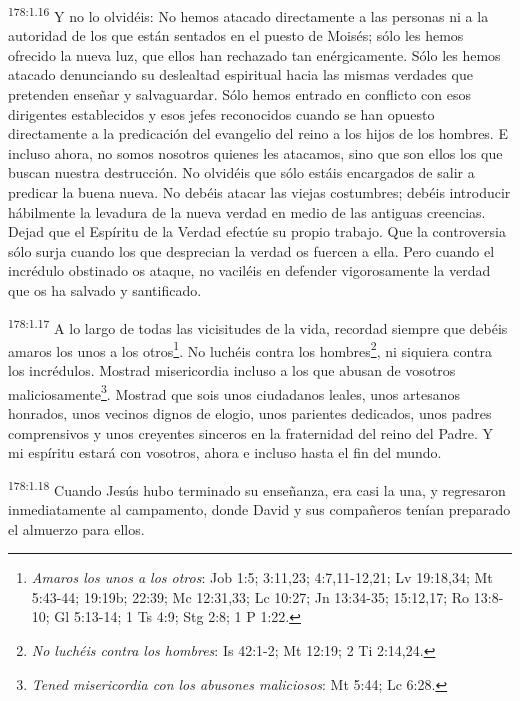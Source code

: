 \par
\textsuperscript{178:1.16} Y no lo olvidéis: No hemos atacado directamente a las personas ni a la autoridad de los que están sentados en el puesto de Moisés; sólo les hemos ofrecido la nueva luz, que ellos han rechazado tan enérgicamente. Sólo les hemos atacado denunciando su deslealtad espiritual hacia las mismas verdades que pretenden enseñar y salvaguardar. Sólo hemos entrado en conflicto con esos dirigentes establecidos y esos jefes reconocidos cuando se han opuesto directamente a la predicación del evangelio del reino a los hijos de los hombres. E incluso ahora, no somos nosotros quienes les atacamos, sino que son ellos los que buscan nuestra destrucción. No olvidéis que sólo estáis encargados de salir a predicar la buena nueva. No debéis atacar las viejas costumbres; debéis introducir hábilmente la levadura de la nueva verdad en medio de las antiguas creencias. Dejad que el Espíritu de la Verdad efectúe su propio trabajo. Que la controversia sólo surja cuando los que desprecian la verdad os fuercen a ella. Pero cuando el incrédulo obstinado os ataque, no vaciléis en defender vigorosamente la verdad que os ha salvado y santificado.

\par
\textsuperscript{178:1.17} A lo largo de todas las vicisitudes de la vida, recordad siempre que debéis amaros los unos a los otros\footnote{\textit{Amaros los unos a los otros}: Job 1:5; 3:11,23; 4:7,11-12,21; Lv 19:18,34; Mt 5:43-44; 19:19b; 22:39; Mc 12:31,33; Lc 10:27; Jn 13:34-35; 15:12,17; Ro 13:8-10; Gl 5:13-14; 1 Ts 4:9; Stg 2:8; 1 P 1:22.}. No luchéis contra los hombres\footnote{\textit{No luchéis contra los hombres}: Is 42:1-2; Mt 12:19; 2 Ti 2:14,24.}, ni siquiera contra los incrédulos. Mostrad misericordia incluso a los que abusan de vosotros maliciosamente\footnote{\textit{Tened misericordia con los abusones maliciosos}: Mt 5:44; Lc 6:28.}. Mostrad que sois unos ciudadanos leales, unos artesanos honrados, unos vecinos dignos de elogio, unos parientes dedicados, unos padres comprensivos y unos creyentes sinceros en la fraternidad del reino del Padre. Y mi espíritu estará con vosotros, ahora e incluso hasta el fin del mundo.

\par
\textsuperscript{178:1.18} Cuando Jesús hubo terminado su enseñanza, era casi la una, y regresaron inmediatamente al campamento, donde David y sus compañeros tenían preparado el almuerzo para ellos.


